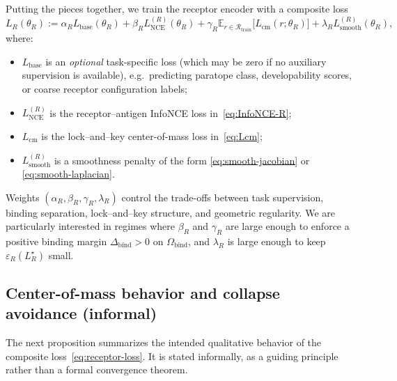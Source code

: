 \documentclass[11pt]{article}
\newcommand{\Rcal}{\mathcal{R}}
\newcommand{\E}{\mathbb{E}}
\begin{document}
Putting the pieces together, we train the receptor encoder with a composite
loss
\begin{equation}
  L_R(\theta_R)
    := \alpha_R L_{\mathrm{base}}(\theta_R)
     + \beta_R L_{\mathrm{NCE}}^{(R)}(\theta_R)
     + \gamma_R \E_{r \in \Rcal_{\mathrm{train}}}
                 \bigl[ L_{\mathrm{cm}}(r;\theta_R) \bigr]
     + \lambda_R L_{\mathrm{smooth}}^{(R)}(\theta_R),
  \label{eq:receptor-loss}
\end{equation}
where:

\begin{itemize}
  \item $L_{\mathrm{base}}$ is an \emph{optional} task-specific loss (which may
    be zero if no auxiliary supervision is available), e.g.\ predicting paratope
    class, developability scores, or coarse receptor configuration labels;
  \item $L_{\mathrm{NCE}}^{(R)}$ is the receptor–antigen InfoNCE loss
    in~\eqref{eq:InfoNCE-R};
  \item $L_{\mathrm{cm}}$ is the lock–and–key center-of-mass loss
    in~\eqref{eq:Lcm};
  \item $L_{\mathrm{smooth}}^{(R)}$ is a smoothness penalty of the form
    \eqref{eq:smooth-jacobian} or \eqref{eq:smooth-laplacian}.
\end{itemize}

Weights $(\alpha_R,\beta_R,\gamma_R,\lambda_R)$ control the trade-offs between
task supervision, binding separation, lock–and–key structure, and geometric
regularity. We are particularly interested in regimes where $\beta_R$ and
$\gamma_R$ are large enough to enforce a positive binding margin
$\Delta_{\mathrm{bind}}>0$ on $\Omega_{\mathrm{bind}}$, and $\lambda_R$ is large
enough to keep $\varepsilon_R(L_R^\star)$ small.

\subsection{Center-of-mass behavior and collapse avoidance (informal)}
\label{subsec:cm-informal}

The next proposition summarizes the intended qualitative behavior of the
composite loss~\eqref{eq:receptor-loss}. It is stated informally, as a
guiding principle rather than a formal convergence theorem.
\end{document}
